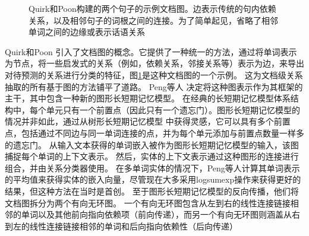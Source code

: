 \documentclass[bachelor]{thesis-uestc}
\begin{document}
\begin{figure}[t!]
\begin{dependency}[theme = simple]
    \end{dependency}
    \vspace{-4em}
    \caption{Quirk和Poon构建的两个句子的示例文档图。边表示传统的句内依赖关系，以及相邻句子的词根之间的连接。为了简单起见，省略了相邻单词之间的边缘或表示话语关系}
    \label{fig_quirk-poon}
\end{figure}
Quirk和Poon 引入了文档图的概念。它提供了一种统一的方法，通过将单词表示为节点，将一些启发式的关系（例如，依赖关系，邻接关系等）表示为边，来导出对待预测的关系进行分类的特征，图\ref{fig_quirk-poon}是这种文档图的一个示例。
这为文档级关系抽取的所有基于图的方法铺平了道路。
Peng等人 决定将这种图表示作为其框架的主干，其中包含一种新的图形长短期记忆模型。
在经典的长短期记忆模型体系结构中，每个单元只有一个前置点（因此只有一个遗忘门）。图形长短期记忆模型的情况并非如此，通过从树形长短期记忆模型 \cite{tai-etal-2015-improved} 中获得灵感，它可以具有多个前置点，包括通过不同边与同一单词连接的点，并为每个单元添加与前置点数量一样多的遗忘门。
从输入文本获得的单词嵌入被作为图形长短期记忆模型的输入，该图捕捉每个单词的上下文表示。
然后，实体的上下文表示通过这种图形的连接进行组合，并由关系分类器使用。
在多单词实体的情况下，Peng等人计算其单词表示的平均值来获得实体的嵌入向量，尽管现在大多采用logsumexp操作来获得更好的结果，但这种方法在当时是首创。
至于图形长短期记忆模型的反向传播，他们将文档图拆分为两个有向无环图。
一个有向无环图包含从左到右的线性连接链接相邻的单词以及其他前向指向依赖项（前向传递），而另一个有向无环图则涵盖从右到左的线性连接链接相邻的单词和后向指向依赖性（后向传递） \par
\end{document}
